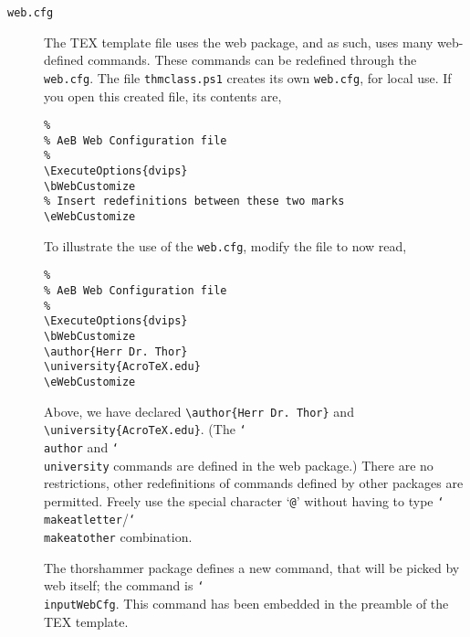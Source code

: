 \documentclass{article}
\let\pkg\textsf
\def\cs#1{\texttt{\char`\\#1}}
\def\thescript{\texttt{thmclass.ps1}}
\begin{document}
\begin{description}
\item[\normalfont\texttt{web.cfg}] The TEX template file uses the
    \pkg{web} package, and as such, uses many
    \pkg{web}-defined commands. These commands can be
    redefined through the \texttt{web.cfg}. The file
    \thescript{} creates its own \texttt{web.cfg}, for local
    use. If you open this created file, its contents are,
\begin{Verbatim}
%
% AeB Web Configuration file
%
\ExecuteOptions{dvips}
\bWebCustomize
% Insert redefinitions between these two marks
\eWebCustomize
\end{Verbatim}
To illustrate the use of the \texttt{web.cfg}, modify the file to now read,
\begin{Verbatim}
%
% AeB Web Configuration file
%
\ExecuteOptions{dvips}
\bWebCustomize
\author{Herr Dr. Thor}
\university{AcroTeX.edu}
\eWebCustomize
\end{Verbatim}
Above, we have declared \verb|\author{Herr Dr. Thor}| and
\verb|\university{AcroTeX.edu}|. (The \cs{author} and \cs{university}
commands are defined in the \pkg{web} package.) There are no restrictions, other
redefinitions of commands defined by other packages are permitted. Freely
use the special character `\texttt{@}' without having to type
\cs{makeatletter}/\allowbreak\cs{makeatother} combination.

      The \pkg{thorshammer} package defines a new command,
      that will be picked by \pkg{web} itself; the command is
      \cs{inputWebCfg}. This command has been embedded in the
      preamble of the TEX template.
\end{description}
\end{document}
